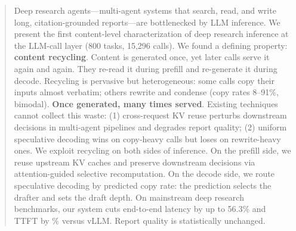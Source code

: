 \begin{abstract}

Deep research agents---multi-agent systems that search, read, and write long, citation-grounded reports---are bottlenecked by LLM inference. We present the first content-level characterization of deep research inference at the LLM-call layer (800 tasks, 15,296 calls). We found a defining property: \textbf{content recycling}. Content is generated once, yet later calls serve it again and again. They re-read it during prefill and re-generate it during decode. Recycling is pervasive but heterogeneous: some calls copy their inputs almost verbatim; others rewrite and condense (copy rates 8--91\%, bimodal). \textbf{Once generated, many times served}. Existing techniques cannot collect this waste: (1) cross-request KV reuse perturbs downstream decisions in multi-agent pipelines and degrades report quality; (2) uniform speculative decoding wins on copy-heavy calls but loses on rewrite-heavy ones. We exploit recycling on both sides of inference. On the prefill side, we reuse upstream KV caches and preserve downstream decisions via attention-guided selective recomputation. On the decode side, we route speculative decoding by predicted copy rate: the prediction selects the drafter and sets the draft depth. On mainstream deep research benchmarks, our system cuts end-to-end latency by up to 56.3\% and TTFT by \tbd\% versus vLLM. Report quality is statistically unchanged.

\end{abstract}